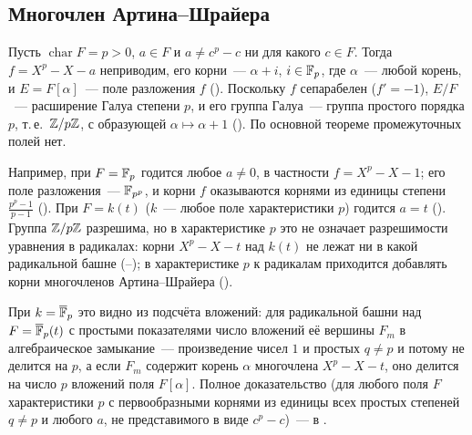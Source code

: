 \subsection*{Многочлен Артина--Шрайера}

\begin{example}[3.23d]
Пусть $\operatorname{char}F=p>0$, $a\in F$ и $a\ne c^p-c$ ни для какого $c\in F$. Тогда $f=X^p-X-a$ неприводим, его корни~---
$\alpha+i$, $i\in\mathbb F_p$, где $\alpha$~--- любой корень, и $E=F[\alpha]$~--- поле разложения $f$ (). Поскольку $f$ сепарабелен
($f'=-1$), $E/F$~--- расширение Галуа степени $p$, и его группа Галуа~--- группа простого порядка $p$, т.\,е.\ $\mathbb Z/p\mathbb Z$, с образующей
$\alpha\mapsto\alpha+1$ (). По основной теореме промежуточных полей нет.

Например, при $F=\mathbb F_p$ годится любое $a\ne0$, в частности $f=X^p-X-1$; его поле разложения~--- $\mathbb F_{p^p}$, и корни $f$
оказываются корнями из единицы степени $\frac{p^p-1}{p-1}$ (). При $F=k(t)$ ($k$~--- любое поле характеристики $p$)
годится $a=t$ (). Группа $\mathbb Z/p\mathbb Z$ разрешима, но в характеристике $p$ это не означает разрешимости уравнения в
радикалах: корни $X^p-X-t$ над $k(t)$ не лежат ни в какой радикальной башне (--); в характеристике $p$ к
радикалам приходится добавлять корни многочленов Артина--Шрайера ().
\end{example}

\begin{remark}
При $k=\overline{\mathbb F}_p$ это видно из подсчёта вложений: для радикальной башни над $F=\overline{\mathbb F}_p(t)$ с простыми показателями число вложений
её вершины $F_m$ в алгебраическое замыкание~--- произведение чисел $1$ и простых $q\ne p$ и потому не делится на $p$, а
если $F_m$ содержит корень $\alpha$ многочлена $X^p-X-t$, оно делится на число $p$ вложений поля $F[\alpha]$. Полное
доказательство (для любого поля $F$ характеристики $p$ с первообразными корнями из единицы всех простых степеней $q\ne p$ и
любого $a$, не представимого в виде $c^p-c$)~--- в .
\end{remark}
